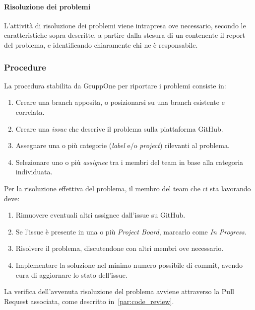 \documentclass[../../norme-di-progetto.tex]{subfiles}
\begin{document}
\paragraph{Risoluzione dei problemi}%
\label{par:risoluzione_dei_problemi}

L'attività di risoluzione dei problemi viene intrapresa ove necessario, secondo le caratteristiche sopra descritte, a partire dalla stesura di un  contenente il report del problema, e identificando chiaramente chi ne è responsabile.

\subsubsection{Procedure}%
\label{subs:risoluzione_dei_problemi/procedure}

La procedura stabilita da GruppOne per riportare i problemi consiste in:

\begin{enumerate}
  \item Creare una branch apposita, o posizionarsi su una branch esistente e correlata.
  \item Creare una \textit{issue} che descrive il problema sulla piattaforma GitHub.
  \item Assegnare una o più categorie (\textit{label} e/o \textit{project}) rilevanti al problema.
  \item Selezionare uno o più \textit{assignee} tra i membri del team in base alla categoria individuata.
\end{enumerate}

Per la risoluzione effettiva del problema, il membro del team che ci sta lavorando deve:

\begin{enumerate}
  \item Rimuovere eventuali altri assignee dall'issue su GitHub.
  \item Se l'issue è presente in una o più \textit{Project Board}, marcarlo come \textit{In Progress}.
  \item Risolvere il problema, discutendone con altri membri ove necessario.
  \item Implementare la soluzione nel minimo numero possibile di commit, avendo cura di aggiornare lo stato dell'issue.
\end{enumerate}

La verifica dell'avvenuta risoluzione del problema avviene attraverso la Pull Request associata, come descritto in~\ref{par:code_review}.
\end{document}
